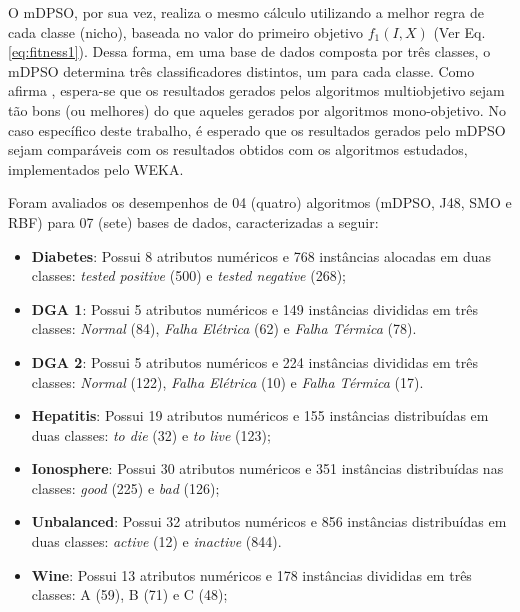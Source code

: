 \documentclass[
	12pt,				%
	openany,			%
	oneside,	
	a4paper,			%
	brazil,				%
	]{unimontes-ppgmsc-abntex2}
\begin{document}
O mDPSO, por sua vez, realiza o mesmo cálculo utilizando a melhor regra de cada classe (nicho), baseada no valor do primeiro objetivo $f_1(I,X)$ (Ver Eq. \ref{eq:fitness1}). Dessa forma, em uma base de dados composta por três classes, o mDPSO determina três classificadores distintos, um para cada classe. Como afirma , espera-se que os resultados gerados pelos algoritmos multiobjetivo sejam tão bons (ou melhores) do que aqueles gerados por algoritmos mono-objetivo. No caso específico deste trabalho, é esperado que os resultados gerados pelo mDPSO sejam comparáveis com os resultados obtidos com os  algoritmos estudados, implementados pelo WEKA.

Foram avaliados os desempenhos de 04 (quatro) algoritmos (mDPSO, J48, SMO e RBF) para 07 (sete) bases de dados, caracterizadas a seguir: 

\begin{itemize}
	\item \textbf{Diabetes}: Possui 8 atributos numéricos  e 768 instâncias alocadas em duas classes: \emph{tested positive} (500) e \emph{tested negative} (268);
 
	\item \textbf{DGA 1}: Possui 5 atributos numéricos e 149 instâncias divididas em três classes: {\em Normal} (84), {\em Falha Elétrica} (62) e {\em Falha Térmica} (78).
	
	\item \textbf{DGA 2}: Possui 5 atributos numéricos e 224 instâncias divididas em três classes: {\em Normal} (122), {\em Falha Elétrica} (10) e {\em Falha Térmica} (17).
 
	\item \textbf{Hepatitis}: Possui 19 atributos numéricos e 155 instâncias distribuídas em duas classes: \emph{to die} (32) e \emph{to live} (123); 
 
	\item \textbf{Ionosphere}: Possui 30 atributos numéricos e 351 instâncias distribuídas nas classes: \emph{good} (225) e \emph{bad} (126);
 
	\item \textbf{Unbalanced}: Possui 32 atributos numéricos e 856 instâncias distribuídas em duas classes: \emph{active} (12) e \emph{inactive} (844).
  
	\item \textbf{Wine}: Possui 13 atributos numéricos e 178 instâncias divididas em três classes: A (59), B (71) e C (48);
\end{itemize}
\end{document}
